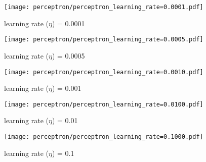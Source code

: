 \documentclass[acmconf,nonacm=true]{acmart}
\begin{document}
\begin{figure}[H]
    \centering  
    \texttt{[image: perceptron/perceptron\_learning\_rate=0.0001.pdf]}
    \caption{learning rate ($\eta$) = 0.0001}
\end{figure}

\begin{figure}[H]
    \centering  
    \texttt{[image: perceptron/perceptron\_learning\_rate=0.0005.pdf]}
    \caption{learning rate ($\eta$) = 0.0005}
\end{figure}

\begin{figure}[H]
    \centering  
    \texttt{[image: perceptron/perceptron\_learning\_rate=0.0010.pdf]}
    \caption{learning rate ($\eta$) = 0.001}
\end{figure}

\begin{figure}[H]
    \centering  
    \texttt{[image: perceptron/perceptron\_learning\_rate=0.0100.pdf]}
    \caption{learning rate ($\eta$) = 0.01}
\end{figure}

\begin{figure}[H]
    \centering  
    \texttt{[image: perceptron/perceptron\_learning\_rate=0.1000.pdf]}
    \caption{learning rate ($\eta$) = 0.1}
\end{figure}
\end{document}
